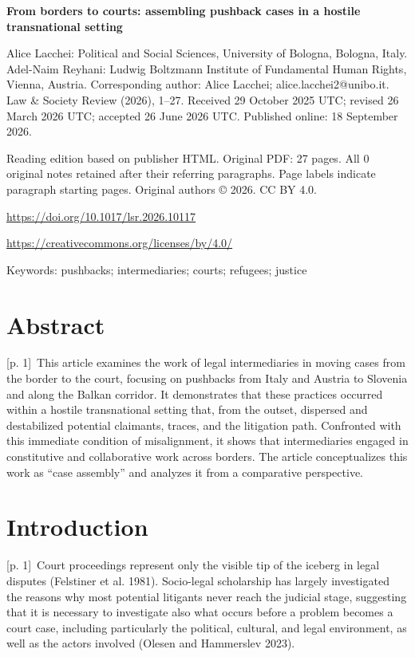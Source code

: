 \documentclass[10pt,a4paper]{article}
\begin{document}
{\Large\bfseries From borders to courts: assembling pushback cases in a hostile transnational setting\par}\medskip

Alice Lacchei: Political and Social Sciences, University of Bologna, Bologna, Italy. Adel-Naim Reyhani: Ludwig Boltzmann Institute of Fundamental Human Rights, Vienna, Austria. Corresponding author: Alice Lacchei; alice.lacchei2@unibo.it. Law \& Society Review (2026), 1–27. Received 29 October 2025 UTC; revised 26 March 2026 UTC; accepted 26 June 2026 UTC. Published online: 18 September 2026.\par
Reading edition based on publisher HTML. Original PDF: 27 pages. All 0 original notes retained after their referring paragraphs. Page labels indicate paragraph starting pages. Original authors © 2026. CC BY 4.0.\par
\url{https://doi.org/10.1017/lsr.2026.10117}\par
\url{https://creativecommons.org/licenses/by/4.0/}\par
Keywords: pushbacks; intermediaries; courts; refugees; justice\par\bigskip
{}\section*{Abstract}
{\scriptsize\color{gray} [p. 1]}\ This article examines the work of legal intermediaries in moving cases from the border to the court, focusing on pushbacks from Italy and Austria to Slovenia and along the Balkan corridor. It demonstrates that these practices occurred within a hostile transnational setting that, from the outset, dispersed and destabilized potential claimants, traces, and the litigation path. Confronted with this immediate condition of misalignment, it shows that intermediaries engaged in constitutive and collaborative work across borders. The article conceptualizes this work as “case assembly” and analyzes it from a comparative perspective.\par
{}\section*{Introduction}
{\scriptsize\color{gray} [p. 1]}\ Court proceedings represent only the visible tip of the iceberg in legal disputes (Felstiner et al. 1981). Socio-legal scholarship has largely investigated the reasons why most potential litigants never reach the judicial stage, suggesting that it is necessary to investigate also what occurs before a problem becomes a court case, including particularly the political, cultural, and legal environment, as well as the actors involved (Olesen and Hammerslev 2023).\par
\end{document}
